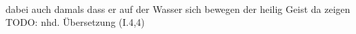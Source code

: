 \begin{exe}
\ex \label{ex:I2245} \gll {}   \object{,}       \object{,}       \\
{dabei} {auch} {damals} {} {dass} {er} {auf} {der} {Wasser} {sich bewegen} {} {der} {heilig} {Geist} {da} {zeigen} {}\\
\glt TODO: nhd. Übersetzung (I.4,4)
\end{exe}
